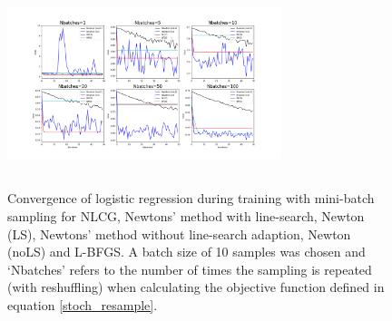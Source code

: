\documentclass[11pt,twocolumn]{article}
\begin{document}
%


\begin{figure}[!ht]
\centering
\includegraphics[height=6cm, width=8cm]{../src-logistic/stoch_logreg_converge_test_10.png}
\caption{Convergence of logistic regression during training with mini-batch sampling for NLCG, Newtons' method with line-search, Newton (LS),  Newtons' method without line-search adaption,  Newton (noLS) and L-BFGS. A batch size of 10 samples was chosen and `Nbatches' refers to the number of times the sampling is repeated (with reshuffling) when calculating the objective function defined in equation \ref{stoch_resample}.}\label{Stoch_Logistic_regression_conv}
\end{figure}
\end{document}

